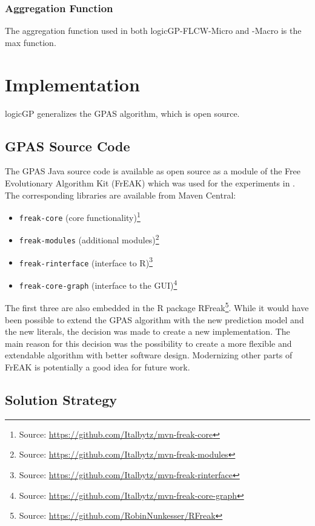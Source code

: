 \documentclass[dvipsnames,format=sigconf,anonymous=false,review=false]{acmart}
\begin{document}
\subsubsection{Aggregation Function}

The aggregation function used in both logicGP-FLCW-Micro and -Macro is the max function. 

\section{Implementation}\label{sec:implementation}

logicGP generalizes the GPAS algorithm, which is open source. 

\subsection{GPAS Source Code}

The GPAS Java source code is available as open source as a module of the Free Evolutionary Algorithm Kit (FrEAK) which was used for the experiments in \citet{10.1007/978-3-540-30217-9_3}. The corresponding libraries are available from Maven Central:

\begin{itemize}
  \item \texttt{freak-core} (core functionality)\footnote{Source: \url{https://github.com/Italbytz/mvn-freak-core}}
  \item \texttt{freak-modules} (additional modules)\footnote{Source: \url{https://github.com/Italbytz/mvn-freak-modules}}
  \item \texttt{freak-rinterface} (interface to R)\footnote{Source: \url{https://github.com/Italbytz/mvn-freak-rinterface}}
  \item \texttt{freak-core-graph} (interface to the GUI)\footnote{Source: \url{https://github.com/Italbytz/mvn-freak-core-graph}}
\end{itemize}

The first three are also embedded in the R package RFreak\footnote{Source: \url{https://github.com/RobinNunkesser/RFreak}}. While it would have been possible to extend the GPAS algorithm with the new prediction model and the new literals, the decision was made to create a new implementation. The main reason for this decision was the possibility to create a more flexible and extendable algorithm with better software design. Modernizing other parts of FrEAK is potentially a good idea for future work.


\subsection{Solution Strategy}
\end{document}
